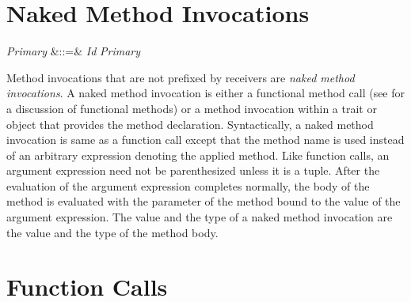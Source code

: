 %
%
%
%

\section{Naked Method Invocations}


\begin{Grammar}
\emph{Primary} &::=& \emph{Id} \emph{Primary}\\

\end{Grammar}

Method invocations that are not prefixed by receivers are \emph{naked
  method invocations}.  A naked method invocation is either a
functional method call (see  for a discussion of
functional methods) or a method invocation within a trait or object
that provides the method declaration.  Syntactically, a naked method
invocation is same as a function call except that the method name is
used instead of an arbitrary expression denoting the applied method.
Like function calls, an argument expression need not be parenthesized
unless it is a tuple.  After the evaluation of the argument expression
completes normally, the body of the method is evaluated with the parameter
of the method bound to the value of the argument expression.  The value
and the type of a naked method invocation are the value and the type
of the method body.


\section{Function Calls}

